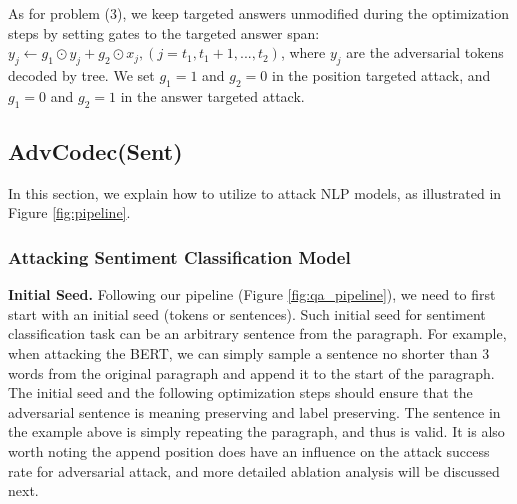 As for problem (3), we keep targeted answers unmodified during the optimization steps by setting gates to the targeted answer span: $y_j \leftarrow  g_1 \odot y_j + g_2 \odot x_j, (j = t_1, t_1+1,... ,t_2)$, where $y_j$ are the adversarial tokens decoded by tree. We set $g_1 = 1$ and $g_2 = 0$ in the position targeted attack, and $g_1=0$ and $g_2=1$ in the answer targeted attack.

\iffalse




\subsection{AdvCodec(Sent)}
In this section, we explain how to utilize \advcodecsent to attack NLP models, as illustrated in Figure \ref{fig:pipeline}.
\subsubsection{Attacking Sentiment Classification Model}
\quad \newline
\textbf{Initial Seed.} Following our pipeline (Figure \ref{fig:qa_pipeline}), we need to first start with an initial seed (tokens or sentences). Such initial seed for sentiment classification task can be an arbitrary sentence from the paragraph. For example, when attacking the BERT, we can simply sample a sentence no shorter than 3 words from the original paragraph and append it to the start of the paragraph. The initial seed and the following optimization steps should ensure that the adversarial sentence is meaning preserving and label preserving. The sentence in the example above is simply repeating the paragraph, and thus is valid. It is also worth noting the append position does have an influence on the attack success rate for adversarial attack, and more detailed ablation analysis will be discussed next.

